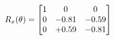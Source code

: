 \documentclass[preview]{standalone}
\begin{document}
\begin{align*}
\special{dvisvgm:raw <g id='unique000'>}R_{x}(\theta) = \begin{bmatrix}1 & 0 & 0 \\0 & -0.81 & -0.59 \\0 & +0.59 & -0.81\end{bmatrix}\special{dvisvgm:raw </g>}
\end{align*}
\end{document}
